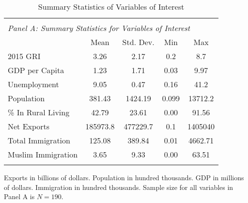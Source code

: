 \documentclass[12pt,english]{article}
\begin{document}
\begin{table}[ht]
\caption{Summary Statistics of Variables of Interest}
\label{tab:descriptives} 
\centering
\begin{threeparttable}
\begin{tabular}{lcccc}
&&&&\\
\multicolumn{5}{l}{\emph{Panel A: Summary Statistics for Variables of Interest}}\\
\toprule
                                                        & Mean  & Std. Dev. & Min   & Max   \\
\midrule
2015 GRI                                      & 3.26 & 2.17     & 0.2 & 8.7 \\
GDP per Capita                                      & 1.23 & 1.71     & 0.03 & 9.97 \\
Unemployment                                         & 9.05 & 0.47     & 0.16 & 41.2 \\
Population                                      & 381.43 & 1424.19     & 0.099 & 13712.2 \\
\% In Rural Living                                      & 42.79 & 23.61     & 0.00 & 91.56 \\
Net Exports                                      & 185973.8 & 477229.7     & 0.1 & 1405040 \\
Total Immigration                                      & 125.08 & 389.84     & 0.01 & 4662.71 \\
Muslim Immigration                                      & 3.65 & 9.33     & 0.00 & 63.51 \\
&&&&\\
\midrule
\bottomrule
\end{tabular}
\footnotesize Exports in billions of dollars. Population in hundred thousands. GDP in millions of dollars. Immigration in hundred thousands. Sample size for all variables in Panel A is $N=190$.
\end{threeparttable}
\end{table}
\end{document}
